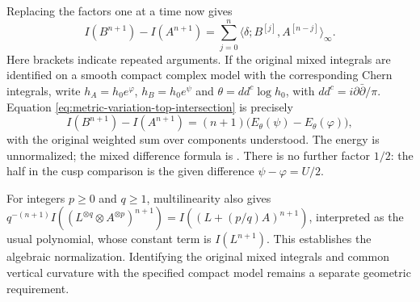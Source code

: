 Replacing the factors one at a time now gives
\begin{equation}\label{eq:metric-variation-top-intersection}
 I(B^{n+1})-I(A^{n+1})
   =\sum_{j=0}^{n}
          \langle\delta;B^{[j]},A^{[n-j]}\rangle_\infty .
\end{equation}
Here brackets indicate repeated arguments.  If the original mixed
integrals are identified on a smooth compact complex model with the
corresponding Chern integrals, write
\(h_A=h_0e^\varphi\), \(h_B=h_0e^\psi\) and
\(\theta=dd^c\log h_0\), with \(dd^c=i\partial\bar\partial/\pi\).
Equation \eqref{eq:metric-variation-top-intersection} is precisely
\begin{equation}\label{eq:metric-variation-energy-factor}
 I(B^{n+1})-I(A^{n+1})
                =(n+1)\bigl(E_\theta(\psi)-E_\theta(\varphi)\bigr),
\end{equation}
with the original weighted sum over components understood.
The energy is unnormalized; the mixed difference formula is
\cite[Proposition~2.1]{boundary-bbgz}.  There is no further factor \(1/2\):
the half in the cusp comparison is the given difference
\(\psi-\varphi=U/2\).

For integers \(p\geq0\) and \(q\geq1\), multilinearity also gives
\(q^{-(n+1)}I((L^{\otimes q}\otimes A^{\otimes p})^{n+1})
 =I((L+(p/q)A)^{n+1})\), interpreted as the usual polynomial,
whose constant term is \(I(L^{n+1})\).
This establishes the algebraic normalization.  Identifying the original
mixed integrals and common vertical curvature with the specified compact
model remains a separate geometric requirement.
